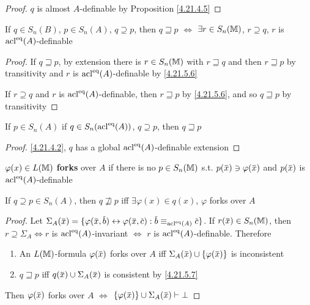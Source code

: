 \documentclass[11pt]{article}
\begin{document}
\begin{proof}
\(q\) is almost \(A\)-definable by Proposition \ref{4.21.4.5}
\end{proof}

\begin{proposition}[]
\label{4.21.5.7}
If \(q\in S_n(B)\), \(p\in S_n(A)\), \(q\supseteq p\), then
\(q\sqsupseteq p\) \(\Leftrightarrow\) \(\exists r\in S_n(\mathbb{M})\), \(r\supseteq q\), \(r\) is \(\operatorname{acl}^{\operatorname{eq}}(A)\)-definable
\end{proposition}

\begin{proof}
If \(q\sqsupseteq p\), by extension there is \(r\in S_n(\mathbb{M})\) with \(r\sqsupseteq q\)  and then \(r\sqsupseteq p\) by
transitivity and \(r\) is \(\operatorname{acl}^{\operatorname{eq}}(A)\)-definable by \ref{4.21.5.6}

If \(r\supseteq q\) and \(r\) is \(\operatorname{acl}^{\operatorname{eq}}(A)\)-definable, then \(r\sqsupseteq p\) by \ref{4.21.5.6}, and
so \(q\sqsupseteq p\) by transitivity
\end{proof}

\begin{proposition}[]
\label{4.21.5.8}
If \(p\in S_n(A)\) if \(q\in S_n(\operatorname{acl}^{\operatorname{eq}}(A))\), \(q\supseteq p\), then \(q\sqsupseteq p\)
\end{proposition}

\begin{proof}
\ref{4.21.4.2}, \(q\) has a global \(\operatorname{acl}^{\operatorname{eq}}(A)\)-definable extension
\end{proof}

\begin{definition}[]
\(\varphi(x)\in L(\mathbb{M})\) \textbf{forks} over \(A\) if there is no \(p\in S_n(\mathbb{M})\) s.t. \(p(\barx)\ni\varphi(\barx)\)
and \(p(\barx)\) is \(\operatorname{acl}^{\operatorname{eq}}(A)\)-definable
\end{definition}

\begin{proposition}[]
If \(q\supseteq p\in S_n(A)\), then \(q\not\sqsupseteq p\) iff \(\exists\varphi(x)\in q(x)\), \(\varphi\) forks over \(A\)
\end{proposition}

\begin{proof}
Let \(\Sigma_A(\barx)=\{\varphi(\barx,\barb)\leftrightarrow\varphi(\barx,\barc):\barb\equiv_{\acl^{\eq}(A)}\barc\}\).
If \(r(\barx)\in S_n(\M)\), then \(r\supseteq\Sigma_A\Leftrightarrow r\) is \(\operatorname{acl}^{\operatorname{eq}}(A)\)-invariant \(\Leftrightarrow\) \(r\)
is \(\operatorname{acl}^{\operatorname{eq}}(A)\)-definable. Therefore
\begin{enumerate}
\item An \(L(\mathbb{M})\)-formula \(\varphi(\barx)\) forks over \(A\) iff \(\Sigma_A(\barx)\cup\{\varphi(\barx)\}\) is
inconsistent
\item \(q\sqsupseteq p\) iff \(q(\barx)\cup\Sigma_A(\barx)\) is consistent by \ref{4.21.5.7}
\end{enumerate}

Then \(\varphi(\barx)\) forks over \(A\) \(\Leftrightarrow\) \(\{\varphi(\barx)\}\cup\Sigma_A(\barx)\vdash\bot\)
\end{proof}
\end{document}
